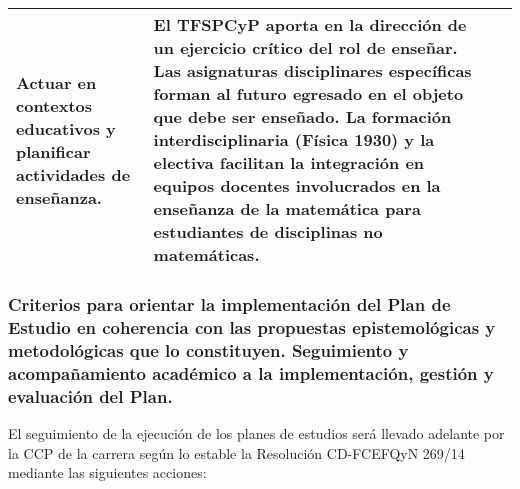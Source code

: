 \documentclass[a4paper, 12pt]{article}
\begin{document}
\begin{center}
\begin{xltabular}{1.0\textwidth}{|>{\raggedright\arraybackslash}X |
>{\raggedright\arraybackslash}X |
>{\raggedright\arraybackslash}X |
}
 
 Actuar en contextos educativos y planificar actividades de enseñanza.

  
  
  &  El TFSPCyP aporta en la dirección de un ejercicio crítico del rol de enseñar. Las asignaturas disciplinares específicas forman al futuro egresado en el objeto que debe ser enseñado. La formación interdisciplinaria (Física 1930) y la electiva  facilitan la integración en equipos docentes involucrados en la enseñanza de la matemática para estudiantes de disciplinas no matemáticas. \\ \hline
  
 
\end{xltabular}
\end{center}
\normalsize


\subsubsection{Criterios para orientar la implementación del Plan de Estudio en coherencia con las propuestas epistemológicas y metodológicas que lo constituyen. Seguimiento y acompañamiento académico a la implementación, gestión y evaluación del Plan.
} 
 

El seguimiento de la ejecución de los planes de estudios será llevado adelante por la CCP de la carrera según lo estable  la Resolución CD-FCEFQyN 269/14 mediante las siguientes acciones:
\end{document}
